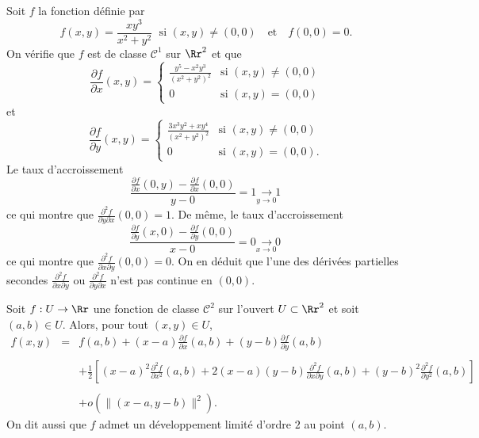 \documentclass[12pt, class=report,crop=false]{standalone}
\begin{document}
Soit $f$ la fonction définie par
$$f(x,y)=\frac{xy^3}{x^2+y^2}\;\mbox{ si }(x,y)\neq (0,0)\quad \mbox{et}\quad f(0,0)= 0.$$
On vérifie que $f$ est de classe $\mathscr{C}^1$ sur $\Rr^2$ et que
$$\frac{\partial f}{\partial x}(x,y)=\left\{\begin{array}{cl}\displaystyle \frac{y^5-x^2y^3}{(x^2+y^2)^2}&\mbox{si }(x,y)\neq (0,0)\\ 0&\mbox{si }(x,y)=(0,0)
\end{array}\right.$$
et 
$$\frac{\partial f}{\partial y}(x,y)=\left\{\begin{array}{cl}\displaystyle \frac{3x^3y^2+xy^4}{(x^2+y^2)^2}&\mbox{si }(x,y)\neq (0,0)\\ 0&\mbox{si }(x,y)=(0,0).\end{array}\right.$$
Le taux d'accroissement
$$\frac{\frac{\partial f}{\partial x}(0,y)-\frac{\partial f}{\partial x}(0,0)}{y-0}=1\underset{y\to 0\; \; \; }{\longrightarrow 1}$$
ce qui montre que $\displaystyle \frac{\partial ^2f}{\partial y\partial x}(0,0)=1$.
De m\^eme, le taux d'accroissement
$$\frac{\frac{\partial f}{\partial y}(x,0)-\frac{\partial f}{\partial y}(0,0)}{x-0}=0\underset{x\to 0\; \; \; }{\longrightarrow 0}$$
ce qui montre que $\displaystyle \frac{\partial ^2f}{\partial x\partial y}(0,0)=0$. On en déduit que l'une des dérivées partielles secondes $\displaystyle \frac{\partial ^2f}{\partial x\partial y}$ ou $\displaystyle \frac{\partial ^2f}{\partial y\partial x}$ n'est pas continue en $(0,0)$.

\vskip6mm

\begin{theoreme}Soit $f:U\to \Rr$ une fonction de classe ${\mathscr C}^2$ sur l'ouvert $U\subset \Rr^2$ et soit $(a,b)\in U$. Alors, pour tout $(x,y)\in U$,
$$\begin{array}{ccl}f(x,y)&=&\displaystyle f(a,b)+(x-a)\frac{\partial f}{\partial x}(a,b)+(y-b)\frac{\partial f}{\partial y}(a,b)\\ \\ & &\displaystyle +\frac{1}{2}\left[(x-a)^2\frac{\partial ^2f}{\partial x^2}(a,b)+2(x-a)(y-b)\frac{\partial ^2f}{\partial x\partial y}(a,b)+(y-b)^2\frac{\partial ^2f}{\partial y^2}(a,b)\right]\\ \\ & &\displaystyle +o\left(\|(x-a,y-b)\|^2\right).\end{array}$$
On dit aussi que $f$ admet un développement limité d'ordre $2$ au point $(a,b)$.
\end{theoreme}
\end{document}
